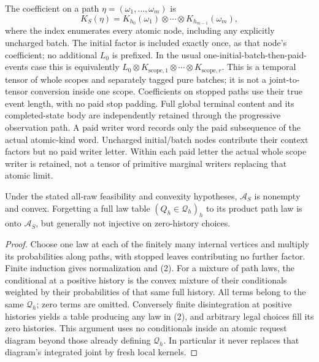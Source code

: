 \documentclass[11pt]{article}\usepackage{amsmath,amssymb,amsthm,geometry}\geometry{margin=1in}
\begin{document}
The coefficient on a path $\eta=(\omega_1,\ldots,\omega_m)$ is
\[
 K_S(\eta)=K_{h_0}(\omega_1)\otimes\cdots
                         \otimes K_{h_{m-1}}(\omega_m),                \tag{3}
\]
where the index enumerates every atomic node, including any explicitly uncharged batch. The initial factor is included exactly once, as that node's coefficient; no additional $L_0$ is prefixed. In the usual one-initial-batch-then-paid-events case this is equivalently $L_0\otimes K_{\mathrm{scope},1}\otimes\cdots\otimes K_{\mathrm{scope},r}$. This is a temporal tensor of whole scopes and separately tagged pure batches; it is not a joint-to-tensor conversion inside one scope. Coefficients on stopped paths use their true event length, with no paid stop padding. Full global terminal content and its completed-state body are independently retained through the progressive observation path. A paid writer word records only the paid subsequence of the actual atomic-kind word. Uncharged initial/batch nodes contribute their context factors but no paid writer letter. Within each paid letter the actual whole scope writer is retained, not a tensor of primitive marginal writers replacing that atomic limit.

\begin{lemma}
Under the stated all-raw feasibility and convexity hypotheses, $\mathcal A_S$ is nonempty and convex. Forgetting a full law table $(Q_h\in\mathcal Q_h)_h$ to its product path law is onto $\mathcal A_S$, but generally not injective on zero-history choices.
\end{lemma}
\begin{proof}
Choose one law at each of the finitely many internal vertices and multiply its probabilities along paths, with stopped leaves contributing no further factor. Finite induction gives normalization and (2). For a mixture of path laws, the conditional at a positive history is the convex mixture of their conditionals weighted by their probabilities of that same full history. All terms belong to the same $\mathcal Q_h$; zero terms are omitted. Conversely finite disintegration at positive histories yields a table producing any law in (2), and arbitrary legal choices fill its zero histories. This argument uses no conditionals inside an atomic request diagram beyond those already defining $\mathcal Q_h$. In particular it never replaces that diagram's integrated joint by fresh local kernels.\end{proof}
\end{document}
